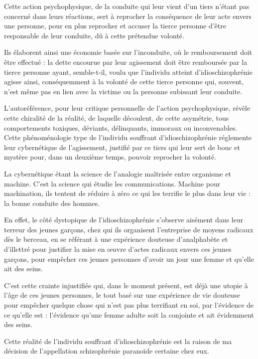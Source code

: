 \documentclass[12pt,oneside]{article}
\begin{document}
Cette action psychophysique, de la conduite qui leur vient d'un tiers n'étant pas concerné dans leurs réactions, sert à reprocher la conséquence de leur acte envers une personne, pour en plus reprocher et accuser la tierce personne d'être responsable de leur conduite, dû à cette prétendue volonté.

Ils élaborent ainsi une économie basée sur l'inconduite, où le remboursement doit être effectué : la dette encourue par leur agissement doit être remboursée par la tierce personne ayant, semble-t-il, voulu que l'individu atteint d'idioschizophrénie agisse ainsi, conséquemment à la volonté de cette tierce personne qui, souvent, n'est même pas en lien avec la victime ou la personne subissant leur conduite.

L'autoréférence, pour leur critique personnelle de l'action psychophysique, révèle cette chiralité de la réalité, de laquelle découlent, de cette asymétrie, tous comportements toxiques, déviants, délinquants, immoraux ou inconvenables. Cette phénoménologie type de l'individu souffrant d'idioschizophrénie réglemente leur cybernétique de l'agissement, justifié par ce tiers qui leur sert de bouc et mystère pour, dans un deuxième temps, pouvoir reprocher la volonté.

La cybernétique étant la science de l'analogie maîtrisée entre organisme et machine. C'est la science qui étudie les communications. Machine pour machination, ils tentent de réduire à zéro ce qui les terrifie le plus dans leur vie : la bonne conduite des hommes.

En effet, le côté dystopique de l'idioschizophrénie s'observe aisément dans leur terreur des jeunes garçons, chez qui ils organisent l'entreprise de moyens radicaux dès le berceau, en se référant à une expérience douteuse d'analphabète et d'illettré pour justifier la mise en œuvre d'actes radicaux envers ces jeunes garçons, pour empêcher ces jeunes personnes d'avoir un jour une femme et qu'elle ait des seins.

C'est cette crainte injustifiée qui, dans le moment présent, est déjà une utopie à l'âge de ces jeunes personnes, le tout basé sur une expérience de vie douteuse pour empêcher quelque chose qui n'est pas plus terrifiant en soi, par l'évidence de ce qu'elle est : l'évidence qu'une femme adulte soit la conjointe et ait évidemment des seins.

Cette réalité de l'individu souffrant d'idioschizophrénie est la raison de ma décision de l'appellation schizophrénie paranoïde certaine chez eux.
\end{document}
